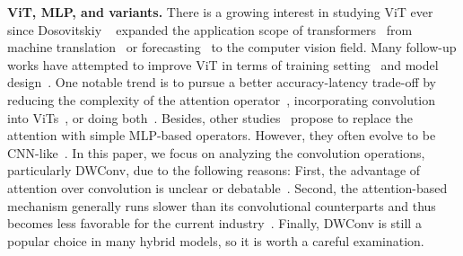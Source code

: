 \medskip\noindent\textbf{ViT, MLP, and variants.} \enspace
 There is a growing interest in studying ViT ever since Dosovitskiy \etal~\cite{dosovitskiy2020image} expanded the application scope of transformers~\cite{vaswani2017attention} from machine translation~\cite{vaswani2017attention} or forecasting~\cite{wen2022social} to the computer vision field. Many follow-up works have attempted to improve ViT in terms of training setting~\cite{touvron2021training,touvron2022deit,steiner2021train} and model design~\cite{liu2021swin,liu2022swin,wang2021pyramid,graham2021levit,zhong2022tree}. One notable trend is to pursue a better accuracy-latency trade-off by reducing the complexity of the attention operator~\cite{ali2021xcit,vaswani2021scaling,huang2022lightvit,lu2021soft,tang2022quadtree}, incorporating convolution into ViTs~\cite{dai2021coatnet,chen2022mobile,srinivas2021bottleneck}, or doing both~\cite{cai2022efficientvit,li2022efficientformer,pan2022edgevits,mehta2022separable}. Besides, other studies~\cite{tolstikhin2021mlp,lian2021mlp,chen2021cyclemlp} propose to replace the attention with simple MLP-based operators. However, they often evolve to be CNN-like~\cite{liu2022we}. In this paper, we focus on analyzing the convolution operations, particularly DWConv, due to the following reasons: First, the advantage of attention over convolution is unclear or debatable~\cite{wang2022shift,liu2022convnet}. Second, the attention-based mechanism generally runs slower than its convolutional counterparts and thus  becomes less favorable for the current industry~\cite{mehta2021mobilevit,hu2019local}. Finally, DWConv is still a popular choice in many hybrid models, so it is worth a careful examination.
 